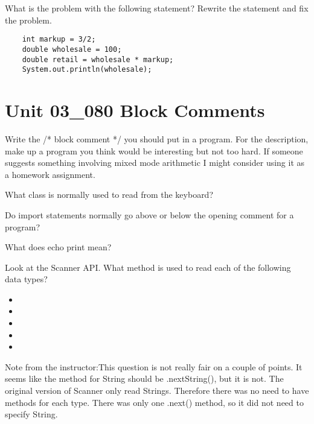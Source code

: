 \documentclass[letterpaper,12pt]{exam}
\newcommand{\unit}{Unit 03}
\begin{document}
\begin{questions}
What is the problem with the following statement?  Rewrite the statement and fix the problem.
\begin{verbatim}
	int markup = 3/2;
	double wholesale = 100;
	double retail = wholesale * markup;
	System.out.println(wholesale);
\end{verbatim}
\section*{\unit\_080 Block Comments} %
\begin{samepage}
	\question Write the /* block comment */ you should put in a program.  For the description, make up a program you think would be interesting but not too hard.  If someone suggests something involving mixed mode arithmetic I might consider using it as a homework assignment.
	\vspace{35mm}
\end{samepage}

\begin{samepage}
	\question What class is normally used to read from the keyboard?
	\vspace{5mm}
\end{samepage}

\begin{samepage}
	\question Do import statements normally go above or below the opening comment for a program?
	\vspace{5mm}
\end{samepage}

\begin{samepage}
	\question What does echo print mean?
	\vspace{5mm}
\end{samepage}

\begin{samepage}
	\question Look at the Scanner API.  What method is used to read each of the following data types?
		  \begin{itemize}
			\item {}
			\vspace{5mm}
			\item {}
			\vspace{5mm}
			\item {}
			\vspace{5mm}
			\item {}
			\vspace{5mm}
			\item {}
			\vspace{5mm}
		   \end{itemize}
		   Note from the instructor:This question is not really fair on a couple of points.  It seems like the method for String should be .nextString(), but it is not.  The original version of Scanner only read Strings.  Therefore there was no need to have methods for each type.  There was only one .next() method, so it did not need to specify String.


\end{samepage}
\end{questions}
\end{document}
